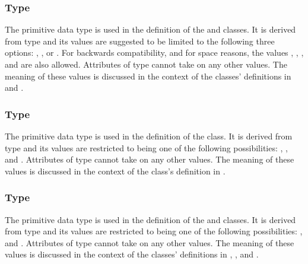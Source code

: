 \subsubsection{Type \fixttspace{}}
\label{primtype-DataKind}

The  primitive data type is used in the definition of the \SampledField and \ParametricGeometry classes.  It is derived from type  and its values are suggested to be limited to the following three options: , , or .  For backwards compatibility, and for space reasons, the values , , , and  are also allowed.  Attributes of type  cannot take on any other values.  The meaning of these values is discussed in the context of the classes' definitions in  and .


\subsubsection{Type \fixttspace{}}
\label{primtype-DiffusionKind}

The  primitive data type is used in the definition of the \DiffusionCoefficient class.  It is derived from type  and its values are restricted to being one of the following possibilities: , , and .  Attributes of type  cannot take on any other values.  The meaning of these values is discussed in the context of the \DiffusionCoefficient class's definition in .


\subsubsection{Type \fixttspace{}}
\label{primtype-CompressionKind}

The  primitive data type is used in the definition of the \SampledField and \ParametricObject classes.  It is derived from type  and its values are restricted to being one of the following possibilities: , and .  Attributes of type  cannot take on any other values.  The meaning of these values is discussed in the context of the classes' definitions in , , and .


